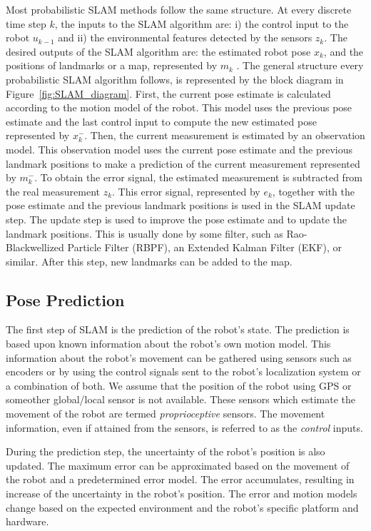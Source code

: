 Most probabilistic SLAM methods follow the same structure. At every discrete time step $ k $, the inputs to the SLAM algorithm are: i) the control input to the robot $ u_{k-1} $ and ii) the environmental features detected by the sensors $ z_k $. The desired outputs of the SLAM algorithm are: the estimated robot pose $ x_k $, and the positions of landmarks or a map, represented by $ m_k $ . The general structure every probabilistic SLAM algorithm follows, is represented by the block diagram in Figure~\ref{fig:SLAM_diagram}. First, the current pose estimate is calculated according to the motion model of the robot. This model uses the previous pose estimate and the last control input to compute the new estimated pose represented by $ x_k^- $. Then, the current measurement is estimated by an observation model. This observation model uses the current pose estimate and the previous landmark positions to make a prediction of the current measurement represented by $ m_k^- $. To obtain the error signal, the estimated measurement is subtracted from the real measurement $ z_k $. This error signal, represented by $ e_k $, together with the pose estimate and the previous landmark positions is used in the SLAM update step. The update step is used to improve the pose estimate and to update the landmark positions. This is usually done by some filter, such as Rao-Blackwellized Particle Filter (RBPF), an Extended Kalman Filter (EKF), or similar. After this step, new landmarks can be added to the map. 

\subsection{Pose Prediction}

The first step of SLAM is the prediction of the robot's state. The prediction is based upon known information about the robot's own motion model. This information about the robot's movement can be gathered using sensors such as encoders or by using the control signals sent to the robot's localization system or a combination of both. We assume that the position of the robot using GPS or someother global/local sensor is not available. These sensors which estimate the movement of the robot are termed \textit{proprioceptive} sensors. The movement information, even if attained from the sensors, is referred to as the \textit{control} inputs.

During the prediction step, the uncertainty of the robot's position is also updated. The maximum error can be approximated based on the movement of the robot and a predetermined error model. The error accumulates, resulting in increase of the uncertainty in the robot's position. The error and motion models change based on the expected environment and the robot's specific platform and hardware.


